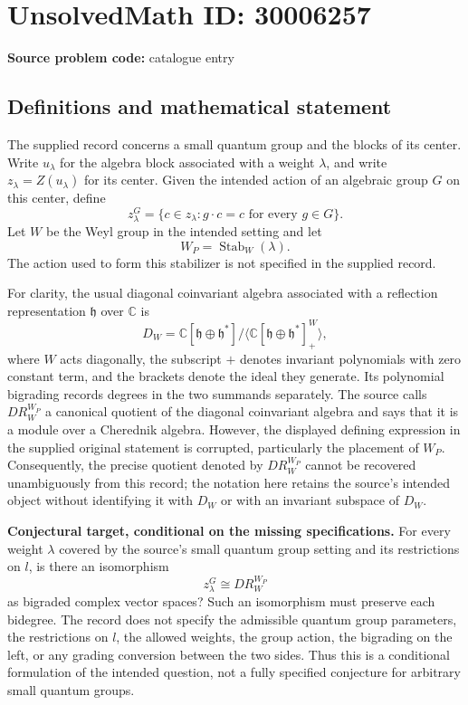 \documentclass[11pt]{article}
\newcommand{\C}{\mathbb{C}}
\begin{document}
\section*{UnsolvedMath ID: 30006257}
\textbf{Source problem code:} catalogue entry
\subsection{Definitions and mathematical statement}
The supplied record concerns a small quantum group and the blocks of its center. Write \(u_\lambda\) for the algebra block associated with a weight \(\lambda\), and write \(z_\lambda=Z(u_\lambda)\) for its center. Given the intended action of an algebraic group \(G\) on this center, define
\[
z_\lambda^G=\{c\in z_\lambda: g\cdot c=c\text{ for every }g\in G\}.
\]
Let \(W\) be the Weyl group in the intended setting and let
\[
W_P=\operatorname{Stab}_W(\lambda).
\]
The action used to form this stabilizer is not specified in the supplied record.

For clarity, the usual diagonal coinvariant algebra associated with a reflection representation \(\mathfrak h\) over \(\C\) is
\[
D_W=\C[\mathfrak h\oplus\mathfrak h^*]\big/\big\langle\C[\mathfrak h\oplus\mathfrak h^*]^W_+\big\rangle,
\]
where \(W\) acts diagonally, the subscript \(+\) denotes invariant polynomials with zero constant term, and the brackets denote the ideal they generate. Its polynomial bigrading records degrees in the two summands separately. The source calls \(DR_W^{W_P}\) a canonical quotient of the diagonal coinvariant algebra and says that it is a module over a Cherednik algebra. However, the displayed defining expression in the supplied original statement is corrupted, particularly the placement of \(W_P\). Consequently, the precise quotient denoted by \(DR_W^{W_P}\) cannot be recovered unambiguously from this record; the notation here retains the source's intended object without identifying it with \(D_W\) or with an invariant subspace of \(D_W\).

\textbf{Conjectural target, conditional on the missing specifications.} For every weight \(\lambda\) covered by the source's small quantum group setting and its restrictions on \(l\), is there an isomorphism
\[
z_\lambda^G\cong DR_W^{W_P}
\]
as bigraded complex vector spaces? Such an isomorphism must preserve each bidegree. The record does not specify the admissible quantum group parameters, the restrictions on \(l\), the allowed weights, the group action, the bigrading on the left, or any grading conversion between the two sides. Thus this is a conditional formulation of the intended question, not a fully specified conjecture for arbitrary small quantum groups.
\end{document}
